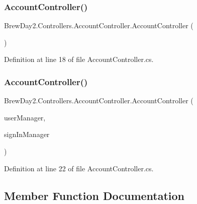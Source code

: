 \subsubsection{\texorpdfstring{Account\+Controller()}{AccountController()}\hspace{0.1cm}{\footnotesize\ttfamily [1/2]}}
{\footnotesize\ttfamily Brew\+Day2.\+Controllers.\+Account\+Controller.\+Account\+Controller (\begin{DoxyParamCaption}{ }\end{DoxyParamCaption})}



Definition at line 18 of file Account\+Controller.\+cs.

\mbox{\label{class_brew_day2_1_1_controllers_1_1_account_controller_ac924bf46d64f8af1443b1f396bc9d462}} 
\subsubsection{\texorpdfstring{Account\+Controller()}{AccountController()}\hspace{0.1cm}{\footnotesize\ttfamily [2/2]}}
{\footnotesize\ttfamily Brew\+Day2.\+Controllers.\+Account\+Controller.\+Account\+Controller (\begin{DoxyParamCaption}\item[{\mbox{\hyperlink{class_brew_day2_1_1_application_user_manager}{Application\+User\+Manager}}}]{user\+Manager,  }\item[{\mbox{\hyperlink{class_brew_day2_1_1_application_sign_in_manager}{Application\+Sign\+In\+Manager}}}]{sign\+In\+Manager }\end{DoxyParamCaption})}



Definition at line 22 of file Account\+Controller.\+cs.



\subsection{Member Function Documentation}
\mbox{\label{class_brew_day2_1_1_controllers_1_1_account_controller_a85707c0c29d5d31427b2d9be10ce74bc}} 
